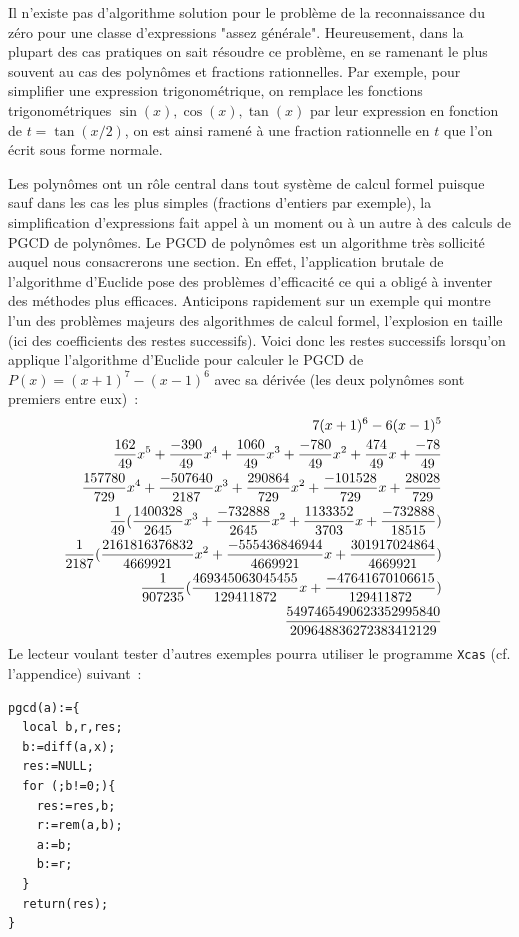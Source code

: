 \documentclass[a4paper,11pt]{article}
\begin{document}
Il n'existe pas d'algorithme solution
pour le problème de la reconnaissance du zéro pour une classe 
d'expressions "assez générale". Heureusement, 
dans la plupart des cas pratiques on sait résoudre ce problème, en
se ramenant le plus souvent au cas des polynômes et fractions rationnelles.
Par exemple, pour simplifier une expression trigonométrique,
on remplace les fonctions trigonométriques $\sin(x), \cos(x), \tan(x)$
par leur expression en fonction de $t=\tan(x/2)$, on est ainsi ramené
à une fraction rationnelle en $t$ que l'on écrit sous forme normale.

Les polynômes ont un r\^ole central dans tout syst\`eme de calcul formel
puisque sauf dans les cas les plus simples (fractions d'entiers par exemple), 
la simplification d'expressions
fait appel \`a un moment ou \`a un autre \`a des calculs
de PGCD de polyn\^omes. Le PGCD de polynômes est un algorithme 
très sollicité auquel nous consacrerons une section. En effet,
l'application brutale de l'algorithme d'Euclide pose des problèmes
d'efficacité ce qui a obligé à inventer des méthodes plus efficaces.
Anticipons rapidement sur un exemple qui montre l'un des problèmes
majeurs des algorithmes de calcul formel, l'explosion en taille
(ici des coefficients des restes successifs).
Voici donc les restes successifs lorsqu'on applique l'algorithme
d'Euclide pour calculer le PGCD de $P(x)=(x+1)^{7}-(x-1)^{6}$ avec
sa d\'eriv\'ee (les deux polyn\^omes sont premiers entre eux)~:
\begin{eqnarray*}
7\* (x+1)^{6}-6\* (x-1)^{5} &&\\
\frac{162}{49} \* x^{5}+\frac{-390}{49} \* x^{4}+\frac{1060}{49} \* x^{3}+\frac{-780}{49} \* x^{2}+\frac{474}{49} \* x+\frac{-78}{49}&&\\
\frac{157780}{729} \* x^{4}+\frac{-507640}{2187} \* x^{3}+\frac{290864}{729} \* x^{2}+\frac{-101528}{729} \* x+\frac{28028}{729}&&\\
\frac{1}{49} \* (\frac{1400328}{2645} \* x^{3}+\frac{-732888}{2645} \* x^{2}+\frac{1133352}{3703} \* x+\frac{-732888}{18515})&&\\
\frac{1}{2187} \* (\frac{2161816376832}{4669921} \* x^{2}+\frac{-555436846944}{4669921} \* x+\frac{301917024864}{4669921})&&\\
\frac{1}{907235} \* (\frac{469345063045455}{129411872} \* x+\frac{-47641670106615}{129411872})&&\\
\frac{5497465490623352995840}{209648836272383412129}
\end{eqnarray*}
Le lecteur voulant tester d'autres exemples pourra utiliser le programme 
\verb|Xcas| (cf. l'appendice) suivant~:
\begin{verbatim}
pgcd(a):={
  local b,r,res;
  b:=diff(a,x);
  res:=NULL;
  for (;b!=0;){
    res:=res,b;
    r:=rem(a,b);
    a:=b;
    b:=r;
  }
  return(res);
}
\end{verbatim}
\end{document}
